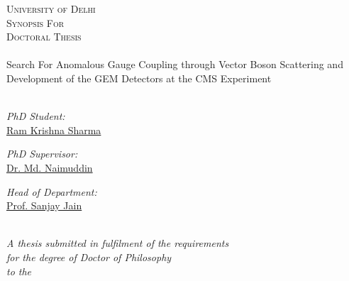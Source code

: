 \begin{titlepage}
\begin{center}

\textsc{\LARGE \color{red!50!black}University of Delhi}\\[1.0cm] %
\textsc{\Large Synopsis For}\\ %
\textsc{\Large Doctoral Thesis}\\ %

\HRule \\[0.2cm] %
{\huge {}\selectfont Search For Anomalous Gauge Coupling through Vector Boson Scattering and Development of the GEM Detectors at the CMS Experiment}\\ %
\HRule \\[0.4cm] %
%
\begin{center}
\emph{PhD Student:}\\
\href{https://ram1123.github.io/about/}{\color{red!50!black}Ram Krishna Sharma} %
\end{center}
\vfill
\begin{minipage}{0.4\textwidth}
\begin{flushleft} \large
\emph{PhD Supervisor:} \\
\href{http://www.du.ac.in/du/uploads/Faculty%20Profiles/2017/Physics/Dec2016_Physics_Naimuddin.pdf}{\color{red!50!black}Dr. Md. Naimuddin} %
\end{flushleft}
\end{minipage}
\begin{minipage}{0.4\textwidth}
\begin{flushright} \large
\emph{Head of Department:} \\
\href{http://www.du.ac.in/du/uploads/Faculty%20Profiles/2017/Physics/Dec2016_Physics_Naimuddin.pdf}{\color{red!50!black}Prof. Sanjay Jain} %
\end{flushright}
\end{minipage}\\[1.0cm]
 
\large \textit{A thesis submitted in fulfilment of the requirements\\ for the degree of Doctor of Philosophy}\\ %
\textit{to the}\\


\end{center}
\end{titlepage}
